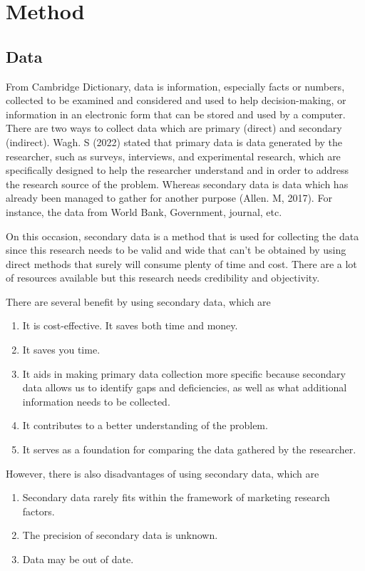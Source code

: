 \documentclass{article}
\begin{document}
\section{Method}
\vspace{30mm}
\subsection{Data}
From Cambridge Dictionary, data is information, especially facts or numbers, collected to be examined and considered and used to help decision-making, or information in an electronic form that can be stored and used by a computer. There are two ways to collect data which are primary (direct) and secondary (indirect). Wagh. S (2022) stated that primary data is data generated by the researcher, such as surveys, interviews, and experimental research, which are specifically designed to help the researcher understand and in order to address the research source of the problem. Whereas secondary data is data which has already been managed to gather for another purpose (Allen. M, 2017). For instance, the data from World Bank, Government, journal, etc.

On this occasion, secondary data is a method that is used for collecting the data since this research needs to be valid and wide that can't be obtained by using direct methods that surely will consume plenty of time and cost. There are a lot of resources available but this research needs credibility and objectivity.

There are several benefit by using secondary data, which are

\begin{enumerate}
  \item It is cost-effective. It saves both time and money.
  \item It saves you time.
  \item It aids in making primary data collection more specific because secondary data allows us to identify gaps and deficiencies, as well as what additional information needs to be collected.
  \item It contributes to a better understanding of the problem.
  \item It serves as a foundation for comparing the data gathered by the researcher.
\end{enumerate}

However, there is also disadvantages of using secondary data, which are

\begin{enumerate}
  \item Secondary data rarely fits within the framework of marketing research factors.
  \item The precision of secondary data is unknown.
  \item Data may be out of date.
\end{enumerate}
\end{document}
